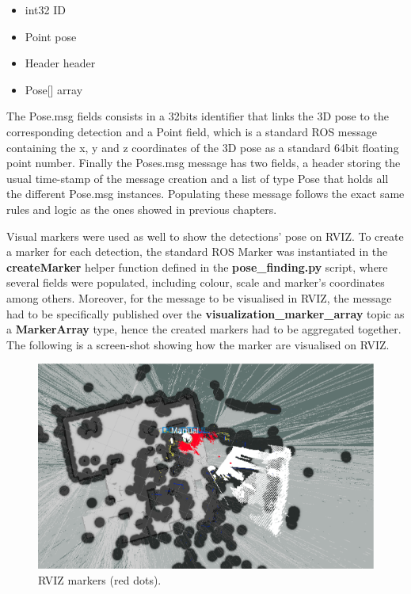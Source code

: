 \begin{multicols}{2}
  \begin{itemize}
    \item int32 ID
    \item Point pose
  \end{itemize}

  \columnbreak

  \begin{itemize}
    \item Header header
    \item Pose[] array
  \end{itemize}
\end{multicols}

The Pose.msg fields consists in a 32bits identifier that links the 3D pose to the corresponding detection and a Point field, which is a standard ROS message containing the x, y and z coordinates of the 3D pose as a standard 64bit floating point number. Finally the Poses.msg message has two fields, a header storing the usual time-stamp of the message creation and a list of type Pose that holds all the different Pose.msg instances. Populating these message follows the exact same rules and logic as the ones showed in previous chapters.

Visual markers were used as well to show the detections' pose on RVIZ. To create a marker for each detection, the standard ROS Marker was instantiated in the \textbf{createMarker} helper function defined in the \textbf{pose\_finding.py} script, where several fields were populated, including colour, scale and marker's coordinates among others. Moreover, for the message to be visualised in RVIZ, the message had to be specifically published over the \textbf{visualization\_marker\_array} topic as a \textbf{MarkerArray} type, hence the created markers had to be aggregated together. The following is a screen-shot showing how the marker are visualised on RVIZ.

\begin{figure}[H]
  \begin{center}
    \includegraphics[width=.9\linewidth]{images/chapter4_markers.png}
  \end{center}
  \caption{RVIZ markers (red dots).}
  \label{fig:markers}
\end{figure}